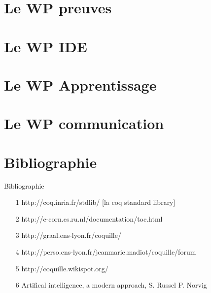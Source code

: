 \documentclass[slidetop]{beamer}
\begin{document}
\section{Le WP preuves}


\section{Le WP IDE}


\section{Le WP Apprentissage}


\section{Le WP communication}


\section{Bibliographie}

\begin{frame}{Bibliographie} 
 \begin{itemize}
\item [1] http://coq.inria.fr/stdlib/ [la coq standard library]
\item [2] http://c-corn.cs.ru.nl/documentation/toc.html%
\item [3] http://graal.ens-lyon.fr/coquille/
\item [4] http://perso.ens-lyon.fr/jeanmarie.madiot/coquille/forum %
\item [5] http://coquille.wikispot.org/ %
\item [6] Artifical intelligence, a modern approach, S. Russel P. Norvig
\end{itemize}
\end{frame}
\end{document}
